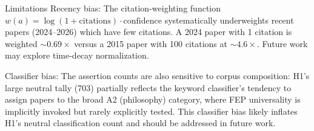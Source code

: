 \documentclass[
  ignorenonframetext,
]{beamer}
\begin{document}
\begin{frame}[allowframebreaks]{Limitations}
\protect{}\label{limitations}
Recency bias: The citation-weighting function
\(w(a) = \log(1+\text{citations})\cdot\text{confidence}\) systematically
underweights recent papers (2024--2026) which have few citations. A 2024
paper with 1 citation is weighted \(\sim0.69\times\) versus a 2015 paper
with 100 citations at \(\sim4.6\times\). Future work may explore
time-decay normalization.

Classifier bias: The assertion counts are also sensitive to corpus
composition: H1's large neutral tally (703) partially reflects the
keyword classifier's tendency to assign papers to the broad A2
(philosophy) category, where FEP universality is implicitly invoked but
rarely explicitly tested. This classifier bias likely inflates H1's
neutral classification count and should be addressed in future work.
\end{frame}
\end{document}
